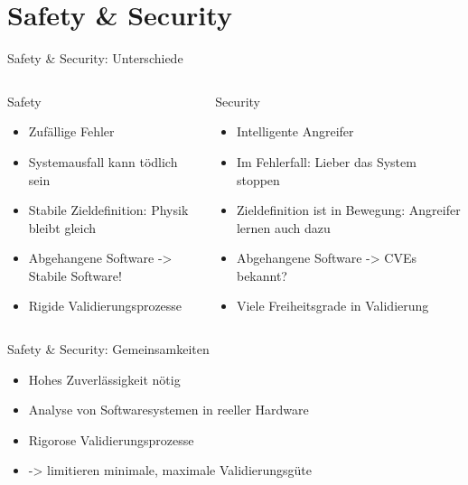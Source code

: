 \section{Safety \& Security}

\begin{frame}[T]{Safety \& Security: Unterschiede}
\small
  \begin{columns}[t,fullwidth]
   \hfill
    \begin{column}{.45\linewidth}
      \begin{block}{Safety}
      \begin{itemize}
        \item Zufällige Fehler
        \item Systemausfall kann tödlich sein
        \item Stabile Zieldefinition: Physik bleibt gleich
        \item Abgehangene Software -> Stabile Software!
        \item Rigide Validierungsprozesse
      \end{itemize}
      \end{block}
    \end{column}
    \hfill
    \begin{column}{.45\linewidth}
      \begin{block}{Security}
      \begin{itemize}
        \item Intelligente Angreifer
        \item Im Fehlerfall: Lieber das System stoppen
        \item Zieldefinition ist in Bewegung: Angreifer lernen auch dazu
        \item Abgehangene Software -> CVEs bekannt?
        \item Viele Freiheitsgrade in Validierung
      \end{itemize}
      \end{block}
    \end{column}
    \hfill
  \end{columns}
\end{frame}


\begin{frame}[T]{Safety \& Security: Gemeinsamkeiten}
  \begin{itemize}
    \item Hohes Zuverlässigkeit nötig
    \item Analyse von Softwaresystemen in reeller Hardware
    \item Rigorose Validierungsprozesse
    \item -> limitieren minimale, maximale Validierungsgüte
  \end{itemize}
\end{frame}


